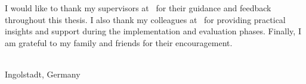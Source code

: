 
I would like to thank my supervisors at \ThesisUniversity\ for their guidance and feedback throughout this thesis.
I also thank my colleagues at \ThesisCompany\ for providing practical insights and support during the implementation and evaluation phases.
Finally, I am grateful to my family and friends for their encouragement.

\ThesisAuthor\\
Ingolstadt, Germany\\
\ThesisSubmissionDate
